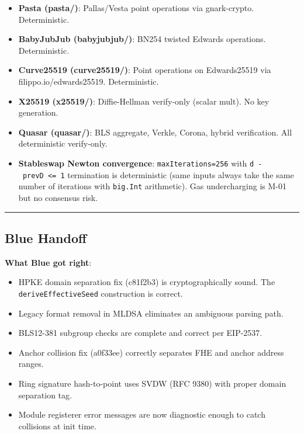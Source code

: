 \documentclass[
]{article}
\providecommand{\tightlist}{%
  \setlength{\itemsep}{0pt}\setlength{\parskip}{0pt}}
\begin{document}
\begin{itemize}
\item
  \textbf{Pasta (pasta/)}: Pallas/Vesta point operations via
  gnark-crypto. Deterministic.
\item
  \textbf{BabyJubJub (babyjubjub/)}: BN254 twisted Edwards operations.
  Deterministic.
\item
  \textbf{Curve25519 (curve25519/)}: Point operations on Edwards25519
  via filippo.io/edwards25519. Deterministic.
\item
  \textbf{X25519 (x25519/)}: Diffie-Hellman verify-only (scalar mult).
  No key generation.
\item
  \textbf{Quasar (quasar/)}: BLS aggregate, Verkle, Corona, hybrid
  verification. All deterministic verify-only.
\item
  \textbf{Stableswap Newton convergence}: \texttt{maxIterations=256}
  with \texttt{\textbar{}d\ -\ prevD\textbar{}\ \textless{}=\ 1}
  termination is deterministic (same inputs always take the same number
  of iterations with \texttt{big.Int} arithmetic). Gas undercharging is
  M-01 but no consensus risk.
\end{itemize}

\begin{center}\rule{0.5\linewidth}{0.5pt}\end{center}

\subsection{Blue Handoff}\label{blue-handoff}

\textbf{What Blue got right}:

\begin{itemize}
\tightlist
\item
  HPKE domain separation fix (c81f2b3) is cryptographically sound. The
  \texttt{deriveEffectiveSeed} construction is correct.
\item
  Legacy format removal in MLDSA eliminates an ambiguous parsing path.
\item
  BLS12-381 subgroup checks are complete and correct per EIP-2537.
\item
  Anchor collision fix (a0f33ee) correctly separates FHE and anchor
  address ranges.
\item
  Ring signature hash-to-point uses SVDW (RFC 9380) with proper domain
  separation tag.
\item
  Module registerer error messages are now diagnostic enough to catch
  collisions at init time.
\end{itemize}
\end{document}
